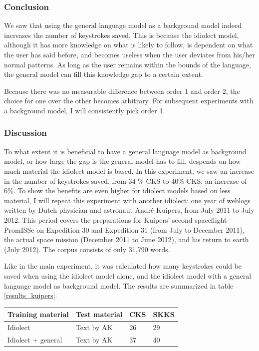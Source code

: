 \documentclass[12pt]{article}
\let\originaltable\table
\let\endoriginaltable\endtable
\renewenvironment{table}[1][ht]{%
  \originaltable[#1]
  \centering}%
  {\endoriginaltable}
\begin{document}
\subsubsection{Conclusion}
We saw that using the general language model as a background model indeed increases the number of keystrokes saved. This is because the idiolect model, although it has more knowledge on what is likely to follow, is dependent on what the user has said before, and becomes useless when the user deviates from his/her normal patterns. As long as the user remains within the bounds of the language, the general model can fill this knowledge gap to a certain extent.

Because there was no measurable difference between order 1 and order 2, the choice for one over the other becomes arbitrary. For subsequent experiments with a background model, I will consistently pick order 1.

\subsubsection{Discussion} \label{simple_exp_disc} %
To what extent it is beneficial to have a general language model as background model, or how large the gap is the general model has to fill, despends on how much material the idiolect model is based. In this experiment, we saw an increase in the number of keystrokes saved, from 34 \% CKS to 40\% CKS: an increase of 6\%. To show the benefits are even higher for idiolect models based on less material, I will repeat this experiment with another idiolect: one year of weblogs written by Dutch physician and astronaut Andr\'e Kuipers, from July 2011 to July 2012. This period covers the preparations for Kuipers' second spaceflight PromISSe on Expedition 30 and Expedition 31 (from July to December 2011), the actual space mission (December 2011 to June 2012), and his return to earth (July 2012). The corpus consists of only 31,790 words. 

Like in the main experiment, it was calculated how many keystrokes could be saved when using the idiolect model alone, and the idiolect model with a general language model as background model. The results are summarized in table \ref{results_kuipers}. 

\begin{table}[H]
\begin{tabular}{ll|ll} 
Training material&Test material&CKS&SKKS\\
\hline
Idiolect&Text by AK&26&29\\
Idiolect + general&Text by AK&37&40\\
\end{tabular} 
\caption{Percentage of keystrokes that can be saved when using the idiolect of Andr\'e Kuipers, with and without background model} \label{results_kuipers}
\end{table}
\end{document}
